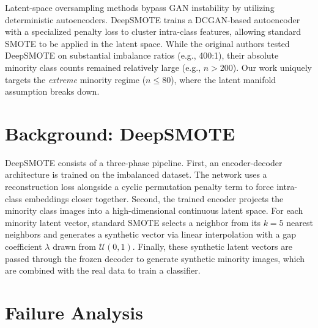 \documentclass[5p,times]{elsarticle}
\begin{document}
Latent-space oversampling methods bypass GAN instability by utilizing deterministic autoencoders. DeepSMOTE \citep{dablain2022deepsmote} trains a DCGAN-based autoencoder \citep{radford2015unsupervised} with a specialized penalty loss to cluster intra-class features, allowing standard SMOTE to be applied in the latent space. While the original authors tested DeepSMOTE on substantial imbalance ratios (e.g., 400:1), their absolute minority class counts remained relatively large (e.g., $n > 200$). Our work uniquely targets the \emph{extreme} minority regime ($n \le 80$), where the latent manifold assumption breaks down.

\section{Background: DeepSMOTE}
\label{sec:background}
DeepSMOTE \citep{dablain2022deepsmote} consists of a three-phase pipeline. First, an encoder-decoder architecture is trained on the imbalanced dataset. The network uses a reconstruction loss alongside a cyclic permutation penalty term to force intra-class embeddings closer together. Second, the trained encoder projects the minority class images into a high-dimensional continuous latent space. For each minority latent vector, standard SMOTE selects a neighbor from its $k=5$ nearest neighbors and generates a synthetic vector via linear interpolation with a gap coefficient $\lambda$ drawn from $\mathcal{U}(0, 1)$. Finally, these synthetic latent vectors are passed through the frozen decoder to generate synthetic minority images, which are combined with the real data to train a classifier.

\section{Failure Analysis}
\label{sec:failure}
\end{document}

